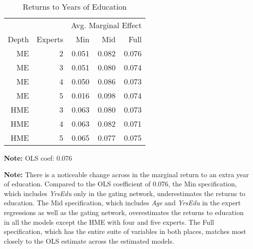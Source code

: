 \documentclass[12pt]{article}
\theoremstyle{definition}
\begin{document}
\begin{table}[t!] \centering
  \caption{Returns to Years of Education}
  \begin{threeparttable}
    \begin{tabular}[l]{r r r r r}
  \cmidrule{1-5}
        &         & \multicolumn{3}{c}{Avg. Marginal Effect} \\ 
  \cmidrule(r){3-5}
  Depth & Experts & Min   & Mid   & Full      \\
  \cmidrule{1-5}

  ME      & 2     & 0.051 & 0.082 & 0.076     \\
  ME      & 3     & 0.051 & 0.080 & 0.074     \\ 
  ME      & 4     & 0.050 & 0.086 & 0.073     \\
  ME      & 5     & 0.016 & 0.098 & 0.074     \\
  HME     & 3     & 0.063 & 0.080 & 0.073     \\
  HME     & 4     & 0.063 & 0.082 & 0.071     \\
  HME     & 5     & 0.065 & 0.077 & 0.075     \\

  \hline
    \end{tabular}
    \begin{tablenotes}
      \item{\footnotesize \textbf{Note:} OLS coef: 0.076}
      \item{\footnotesize \textbf{Note:} There is a noticeable change across in the marginal return to an extra year of education. Compared to the OLS coefficient of 0.076, the Min specification, which includes \textit{YrsEdu} only in the gating network, underestimates the returns to education. The Mid specification, which includes \textit{Age} and \textit{YrsEdu} in the expert regressions as well as the gating network, overestimates the returns to education in all the models except the HME with four and five experts. The Full specification, which has the entire suite of variables in both places, matches most closely to the OLS estimate across the estimated models.}
    \end{tablenotes} \label{tbl:YrsEdu_coef}
  \end{threeparttable}
\end{table}

\bigskip
\end{document}
